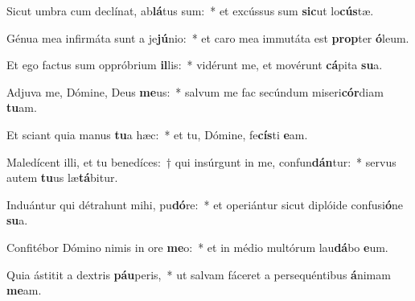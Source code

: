 \item Sicut umbra cum declínat, ab\textbf{lá}tus sum:~* et excússus sum \textbf{sic}ut lo\textbf{cús}tæ.
\item Génua mea infirmáta sunt a je\textbf{jú}nio:~* et caro mea immutáta est \textbf{prop}ter \textbf{ó}leum.
\item Et ego factus sum oppróbrium \textbf{il}lis:~* vidérunt me, et movérunt \textbf{cá}pita \textbf{su}a.
\item Adjuva me, Dómine, Deus \textbf{me}us:~* salvum me fac secúndum miseri\textbf{cór}diam \textbf{tu}am.
\item Et sciant quia manus \textbf{tu}a hæc:~* et tu, Dómine, fe\textbf{cís}ti \textbf{e}am.
\item Maledícent illi, et tu benedíces:~† qui insúrgunt in me, confun\textbf{dán}tur:~* servus autem \textbf{tu}us læ\textbf{tá}bitur.
\item Induántur qui détrahunt mihi, pu\textbf{dó}re:~* et operiántur sicut diplóide confusi\textbf{ó}ne \textbf{su}a.
\item Confitébor Dómino nimis in ore \textbf{me}o:~* et in médio multórum lau\textbf{dá}bo \textbf{e}um.
\item Quia ástitit a dextris \textbf{páu}peris,~* ut salvam fáceret a persequéntibus \textbf{á}nimam \textbf{me}am.
